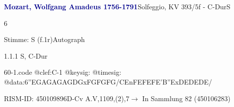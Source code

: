 \documentclass[a4paper, twocolumn, 11pt]{book}
\begin{document}
\par \vspace{16pt} \textcolor{darkblue}{\textbf{Mozart, Wolfgang Amadeus  1756-1791}}\hfillplus{[60]}\newline Solfeggio, KV 393/5f - C-Dur\newline S
\par \begin{itshape} 6\end{itshape} 
\par \textcolor{darkblue}{}  Stimme: S  (f.1r)\newline Autograph
\par 1.1.1  S, C-Dur  
\begin{filecontents*}{60-1.code}
@clef:C-1
@keysig:
@timesig:
@data:6''{EGAG}{AGAG}{DGxFG}{FGFG}/{CEnFE}{FEFE}{'B''ExDE}{DEDE}/
\end{filecontents*}
\newline %
\par RISM-ID: 450109896\newline D-Cv  A.V,1109,(2),7\newline $\rightarrow$ In Sammlung 82 (450106283)
      
\end{document}

